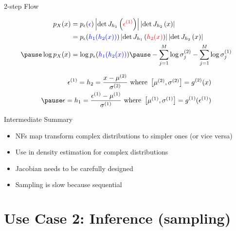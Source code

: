 \documentclass[14pt]{beamer}
\begin{document}
\begin{frame}{2-step Flow}
\begin{small}
\begin{equation*}
\begin{aligned}
p_{X}(x) &= p_{\epsilon}(\textcolor{blue}{\epsilon})\djac{h_{1}}{\textcolor{red}{\epsilon^{(1)}}}\djac{h_{2}}{x} \\
&= p_{\epsilon}(\textcolor{blue}{h_{1}(h_{2}(x))})\djac{h_{1}}{\textcolor{red}{h_{2}(x)}}\djac{h_{2}}{x} \\ \pause
\log p_{X}(x) &= \log p_{\epsilon}(\textcolor{blue}{h_{1}(h_{2}(x))})\pause -\sum_{j=1}^{M}\log\sigma^{(2)}_{j}-\sum_{j=1}^{M}\log\sigma^{(1)}_{j}
\end{aligned}
\end{equation*}
\end{small}
\pause
\begin{equation*}
\begin{aligned}
\epsilon^{(1)} = h_{2} = \frac{x - \mu^{(2)}}{\sigma^{(2)}} \text{ where } \begin{bmatrix}\mu^{(2)}, \sigma^{(2)}\end{bmatrix} = g^{(2)}(x) \\ \pause
\epsilon = h_{1} = \frac{\epsilon^{(1)} - \mu^{(1)}}{\sigma^{(1)}} \text{ where } \begin{bmatrix}\mu^{(1)}, \sigma^{(1)}\end{bmatrix} = g^{(1)}(\epsilon^{(1)})
\end{aligned}
\end{equation*}
\end{frame}

\begin{frame}{Intermediate Summary}
\begin{itemize}
\item NFs map transform complex distributions to simpler ones (or vice versa)
\item Use in density estimation for complex distributions
\item Jacobian needs to be carefully designed
\item Sampling is slow because sequential
\end{itemize}
\end{frame}

\section{Use Case 2: Inference (sampling)}
\begin{frame}
\tableofcontents[current]
\end{frame}
\end{document}
